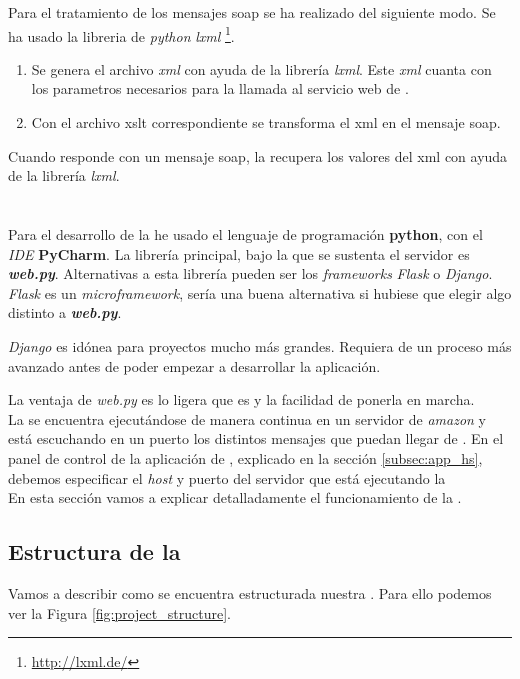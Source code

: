 Para el tratamiento de los mensajes \acrshort{soap} se ha realizado del siguiente modo.
Se ha usado la libreria de \textit{python} \textit{lxml} \footnote{\url{http://lxml.de/}}. 
\begin{enumerate}
	\item Se genera el archivo \textit{xml} con ayuda de la librería \textit{lxml}. Este \textit{xml} cuanta con los parametros necesarios para la llamada al servicio web de \wday{}.
	
	\item Con el archivo \acrshort{xslt} correspondiente se transforma el \acrshort{xml} en el mensaje \acrshort{soap}.
\end{enumerate}

Cuando \wday{} responde con un mensaje \acrshort{soap}, la \iface{} recupera los valores del \acrshort{xml} con ayuda de la librería \textit{lxml}.

\section{\iface{}}


Para el desarrollo de la \iface{} he usado el lenguaje de programación \textbf{python}, con el \textit{IDE} \textbf{PyCharm}. La librería principal, bajo la que se sustenta el servidor es \textbf{\textit{web.py}}.
Alternativas a esta librería pueden ser los \textit{frameworks} \textit{Flask} o \textit{Django}.
\textit{Flask} es un \textit{microframework}, sería una buena alternativa si hubiese que elegir algo distinto a  \textbf{\textit{web.py}}.

\textit{Django} es idónea para proyectos mucho más grandes. Requiera de un proceso más avanzado antes de poder empezar a desarrollar la aplicación.

La ventaja de \textit{web.py} es lo ligera que es y la facilidad de ponerla en marcha.\\

La \iface{} se encuentra ejecutándose de manera continua en un servidor de \textit{amazon} y está escuchando en un puerto los distintos mensajes que puedan llegar de \hs{}.
En el panel de control de la aplicación de \hs{}, explicado en la sección \ref{subsec:app_hs}, debemos especificar el \textit{host} y puerto del servidor que está ejecutando la \iface{}\\


En esta sección vamos a explicar detalladamente el funcionamiento de la \iface{}.

\subsection{Estructura de la \iface{}}
Vamos a describir como se encuentra estructurada nuestra \iface. Para ello podemos ver la Figura \ref{fig:project_structure}. 

